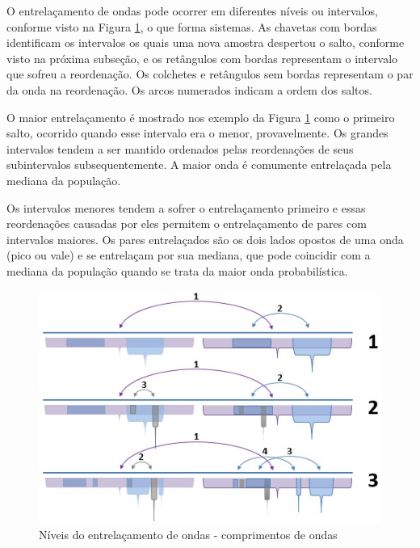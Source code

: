 O entrelaçamento de ondas pode ocorrer em diferentes níveis ou intervalos, conforme visto na Figura \ref{fig:consciousness_subconscious_entanglement}, o que forma sistemas. As chavetas com bordas identificam os intervalos os quais uma nova amostra despertou o salto, conforme visto na próxima subseção, e os retângulos com bordas representam o intervalo que sofreu a reordenação. Os colchetes e retângulos sem bordas representam o par da onda na reordenação. Os arcos numerados indicam a ordem dos saltos.

O maior entrelaçamento é mostrado nos exemplo da Figura \ref{fig:consciousness_subconscious_entanglement} como o primeiro salto, ocorrido quando esse intervalo era o menor, provavelmente. Os grandes intervalos tendem a ser mantido ordenados pelas reordenações de seus subintervalos subsequentemente. A maior onda é comumente entrelaçada pela mediana da população. 

Os intervalos menores tendem a sofrer o entrelaçamento primeiro e essas reordenações causadas por eles permitem o entrelaçamento de pares com intervalos maiores. Os pares entrelaçados são os dois lados opostos de uma onda (pico ou vale) e se entrelaçam por sua mediana, que pode coincidir com a mediana da população quando se trata da maior onda probabilística.
	\begin{figure}[H]
	\caption{Níveis do entrelaçamento de ondas - comprimentos de ondas}
	\label{fig:consciousness_subconscious_entanglement}
	\centering
	\includegraphics[scale=.8]{sections/images/consciousness_subconscious_entanglement.jpg}
	\end{figure}

